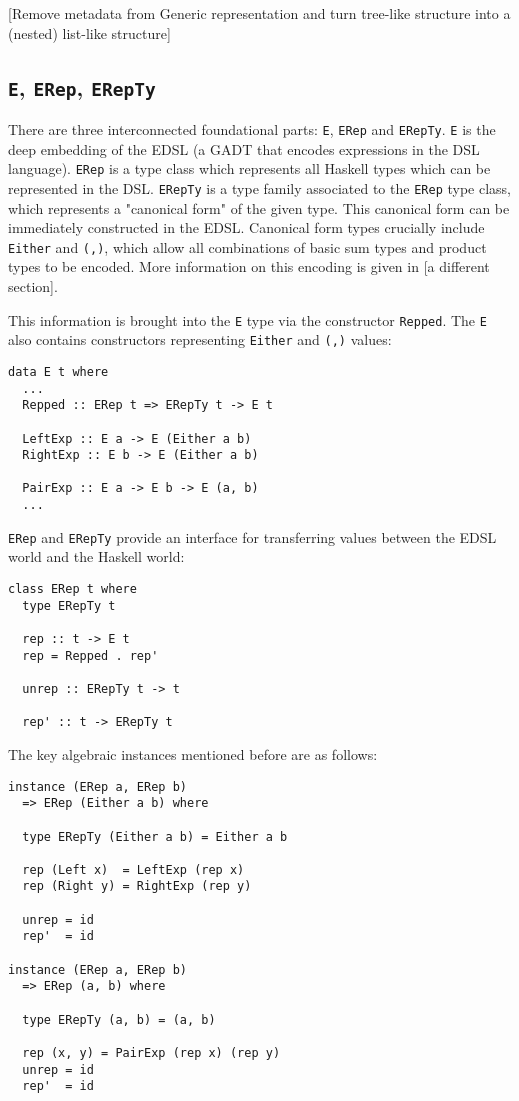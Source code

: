 \documentclass[sigplan,screen]{acmart}
\newcommand{\ttt}{\texttt}
\begin{document}
[Remove metadata from Generic representation and turn tree-like structure into a (nested) list-like structure]

\subsection{\ttt{E}, \ttt{ERep}, \ttt{ERepTy}}

There are three interconnected foundational parts: \ttt{E}, \ttt{ERep} and
\ttt{ERepTy}. \ttt{E} is the deep embedding of the EDSL (a GADT that encodes
expressions in the DSL language). \ttt{ERep} is a type class which represents
all Haskell types which can be represented in the DSL. \ttt{ERepTy} is a type
family associated to the \ttt{ERep} type class, which represents a "canonical form"
of the given type. This canonical form can be immediately constructed in the EDSL.
Canonical form types crucially include \ttt{Either} and \ttt{(,)}, which
allow all combinations of basic sum types and product types to be encoded. More
information on this encoding is given in [a different section].

This information is brought into the \ttt{E} type via the constructor
\ttt{Repped}. The \ttt{E} also contains constructors representing \ttt{Either}
and \ttt{(,)} values:

\begin{lstlisting}
data E t where
  ...
  Repped :: ERep t => ERepTy t -> E t

  LeftExp :: E a -> E (Either a b)
  RightExp :: E b -> E (Either a b)

  PairExp :: E a -> E b -> E (a, b)
  ...
\end{lstlisting}

\ttt{ERep} and \ttt{ERepTy} provide an interface for transferring values between the EDSL
world and the Haskell world:

\begin{lstlisting}
class ERep t where
  type ERepTy t

  rep :: t -> E t
  rep = Repped . rep'

  unrep :: ERepTy t -> t

  rep' :: t -> ERepTy t
\end{lstlisting}

The key algebraic instances mentioned before are as follows:

\begin{lstlisting}
instance (ERep a, ERep b)
  => ERep (Either a b) where

  type ERepTy (Either a b) = Either a b

  rep (Left x)  = LeftExp (rep x)
  rep (Right y) = RightExp (rep y)

  unrep = id
  rep'  = id

instance (ERep a, ERep b)
  => ERep (a, b) where

  type ERepTy (a, b) = (a, b)

  rep (x, y) = PairExp (rep x) (rep y)
  unrep = id
  rep'  = id
\end{lstlisting}
\end{document}
